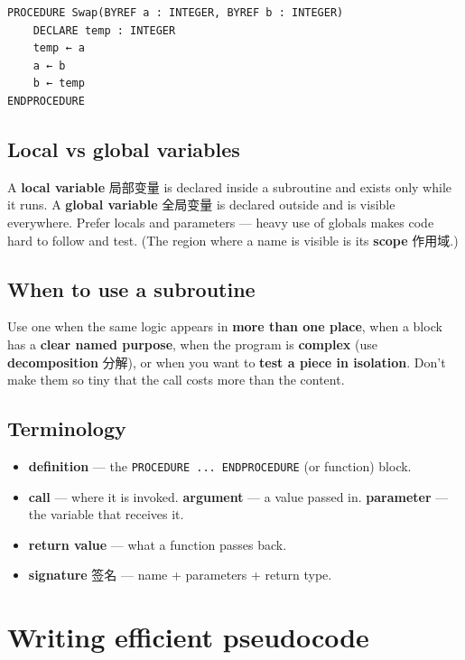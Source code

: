 \documentclass[11pt]{article}
\begin{document}
\begin{Verbatim}
PROCEDURE Swap(BYREF a : INTEGER, BYREF b : INTEGER)
    DECLARE temp : INTEGER
    temp ← a
    a ← b
    b ← temp
ENDPROCEDURE
\end{Verbatim}

\subsection*{Local vs global variables}

A \textbf{local variable} 局部变量 is declared inside a subroutine and exists only while it runs. A \textbf{global variable} 全局变量 is declared outside and is visible everywhere. Prefer locals and parameters — heavy use of globals makes code hard to follow and test. (The region where a name is visible is its \textbf{scope} 作用域.)

\subsection*{When to use a subroutine}

Use one when the same logic appears in \textbf{more than one place}, when a block has a \textbf{clear named purpose}, when the program is \textbf{complex} (use \textbf{decomposition} 分解), or when you want to \textbf{test a piece in isolation}. Don't make them so tiny that the call costs more than the content.

\subsection*{Terminology}

\begin{itemize}
\item \textbf{definition} — the \texttt{PROCEDURE ... ENDPROCEDURE} (or function) block.

\item \textbf{call} — where it is invoked. \textbf{argument} — a value passed in. \textbf{parameter} — the variable that receives it.

\item \textbf{return value} — what a function passes back.

\item \textbf{signature} 签名 — name + parameters + return type.

\end{itemize}

\section*{Writing efficient pseudocode}
\end{document}
